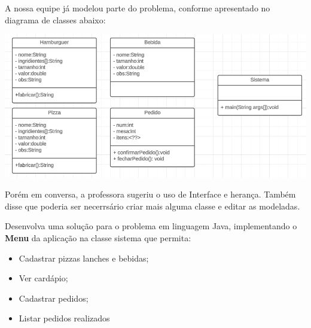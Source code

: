 \documentclass[12pt,a4paper, brazil]{article}
\begin{document}
\par
A nossa equipe já modelou parte do problema, conforme apresentado no diagrama de classes abaixo:

\begin{center}
    \includegraphics[width=0.7\paperwidth]{atividades/class_atv_aula18.png} \\
  \end{center}

  \par
  Porém em conversa, a professora sugeriu o uso de Interface e herança. Também disse que poderia ser necerrsário criar mais alguma classe e editar as modeladas.

  \par
  Desenvolva uma solução para o problema em linguagem Java, implementando o \textbf{Menu} da aplicação na classe sistema que permita:
  \begin{itemize}
      \item Cadastrar pizzas lanches e bebidas;
      \item Ver cardápio;
      \item Cadastrar pedidos;
      \item Listar pedidos realizados
  \end{itemize}

\end{document}
